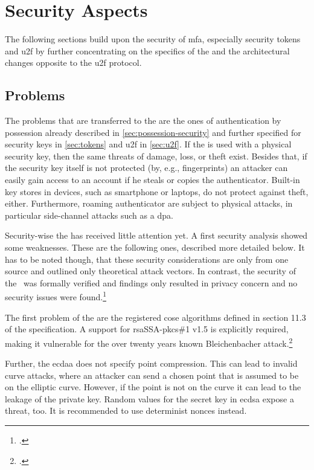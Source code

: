 \section{Security Aspects}

The following sections build upon the security of \gls{mfa}, especially security tokens and \gls{u2f} by further concentrating on the specifics of the \wa{} and the architectural changes opposite to the \gls{u2f} protocol.

\subsection{Problems}

The problems that are transferred to the \wa{} are the ones of authentication by possession already described in \autoref{sec:possession-security} and further specified for security keys in \autoref{sec:tokens} and \gls{u2f} in \autoref{sec:u2f}. If the \wa{} is used with a physical security key, then the same threats of damage, loss, or theft exist. Besides that, if the security key itself is not protected (by, e.g., fingerprints) an attacker can easily gain access to an account if he steals or copies the authenticator. Built-in key stores in devices, such as smartphone or laptops, do not protect against theft, either. Furthermore, roaming authenticator are subject to physical attacks, in particular side-channel attacks such as a \gls{dpa}.

Security-wise the \wa{} has received little attention yet. A first security analysis showed some weaknesses. These are the following ones, described more detailed below. It has to be noted though, that these security considerations are only from one source and outlined only theoretical attack vectors. In contrast, the security of the \wa{} was formally verified and findings only resulted in privacy concern and no security issues were found.\footcites[See][]{paragon-webauth}[See][9]{FormalVerificationWebAuthn}

The first problem of the \wa{} are the registered \gls{cose} algorithms defined in section 11.3 of the specification. A support for \gls{rsa}SSA-\gls{pkcs}\#1 v1.5 is explicitly required, making it vulnerable for the over twenty years known \frqq Bleichenbacher attack\flqq.\footcites[See][]{10.1007/BFb0055716}[See][Chapter 11.3]{w3c}

Further, the \gls{ecdaa} does not specify point compression. This can lead to invalid curve attacks, where an attacker can send a chosen point that is assumed to be on the elliptic curve. However, if the point is not on the curve it can lead to the leakage of the private key. Random values for the secret key in \gls{ecdsa} expose a threat, too. It is recommended to use determinist \glspl{nonce} instead.


